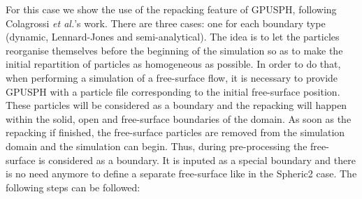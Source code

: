\documentclass{../GPUSPHtemplate}
\begin{document}
For this case we show the use of the repacking feature of GPUSPH, following Colagrossi \textit{et al.}'s work.
There are three cases: one for each boundary type (dynamic, Lennard-Jones and semi-analytical).
The idea is to let the particles reorganise themselves before the beginning of the simulation so as to
make the initial repartition of particles as homogeneous as possible. In order to do that, when performing a simulation
of a free-surface flow, it is necessary to provide GPUSPH with a particle file corresponding to the initial free-surface
position. These particles will be considered as a boundary and the repacking will happen within the solid, open and free-surface
boundaries of the domain. As soon as the repacking if finished, the free-surface particles are removed from the simulation
domain and the simulation can begin. Thus, during pre-processing the free-surface is considered as a boundary.
It is inputed as a special boundary and there is no need anymore to define a separate free-surface like in the Spheric2 case.
The following steps can be followed:
\end{document}
